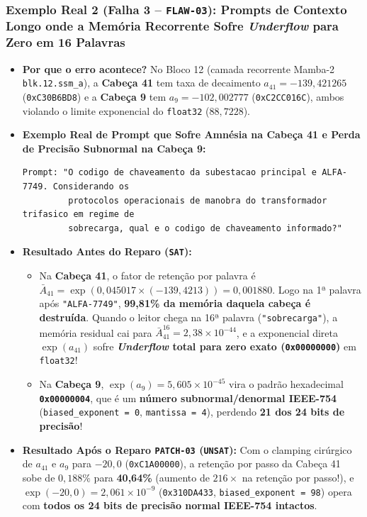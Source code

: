 \documentclass[11pt,a4paper]{article}
\theoremstyle{definition}
\begin{document}
\subsubsection{Exemplo Real 2 (Falha 3 -- \texttt{FLAW-03}): Prompts de Contexto Longo onde a Memória Recorrente Sofre \textit{Underflow} para Zero em 16 Palavras}
\begin{itemize}
    \item \textbf{Por que o erro acontece?} No Bloco 12 (camada recorrente Mamba-2 \texttt{blk.12.ssm\_a}), a \textbf{Cabeça 41} tem taxa de decaimento $a_{41} = -139{,}421265$ (\texttt{0xC30B6BD8}) e a \textbf{Cabeça 9} tem $a_9 = -102{,}002777$ (\texttt{0xC2CC016C}), ambos violando o limite exponencial do \texttt{float32} ($88{,}7228$).
    \item \textbf{Exemplo Real de Prompt que Sofre Amnésia na Cabeça 41 e Perda de Precisão Subnormal na Cabeça 9:}
    \begin{verbatim}
Prompt: "O codigo de chaveamento da subestacao principal e ALFA-7749. Considerando os
         protocolos operacionais de manobra do transformador trifasico em regime de
         sobrecarga, qual e o codigo de chaveamento informado?"
    \end{verbatim}
    \item \textbf{Resultado Antes do Reparo (\texttt{SAT}):}
    \begin{itemize}
        \item Na \textbf{Cabeça 41}, o fator de retenção por palavra é $\bar{A}_{41} = \exp(0{,}045017 \times (-139{,}4213)) = 0{,}001880$. Logo na 1ª palavra após \texttt{"ALFA-7749"}, \textbf{99,81\% da memória daquela cabeça é destruída}. Quando o leitor chega na 16ª palavra (\texttt{"sobrecarga"}), a memória residual cai para $\bar{A}_{41}^{16} = 2{,}38 \times 10^{-44}$, e a exponencial direta $\exp(a_{41})$ sofre \textbf{\textit{Underflow} total para zero exato (\texttt{0x00000000})} em \texttt{float32}!
        \item Na \textbf{Cabeça 9}, $\exp(a_9) = 5{,}605 \times 10^{-45}$ vira o padrão hexadecimal \textbf{\texttt{0x00000004}}, que é um \textbf{número subnormal/denormal IEEE-754} (\texttt{biased\_exponent = 0}, \texttt{mantissa = 4}), perdendo \textbf{21 dos 24 bits de precisão}!
    \end{itemize}
    \item \textbf{Resultado Após o Reparo \texttt{PATCH-03} (\texttt{UNSAT}):} Com o clamping cirúrgico de $a_{41}$ e $a_9$ para $-20{,}0$ (\texttt{0xC1A00000}), a retenção por passo da Cabeça 41 sobe de $0{,}188\%$ para \textbf{40,64\%} (aumento de $216\times$ na retenção por passo!), e $\exp(-20{,}0) = 2{,}061 \times 10^{-9}$ (\texttt{0x310DA433}, \texttt{biased\_exponent = 98}) opera com \textbf{todos os 24 bits de precisão normal IEEE-754 intactos}.
\end{itemize}
\end{document}

